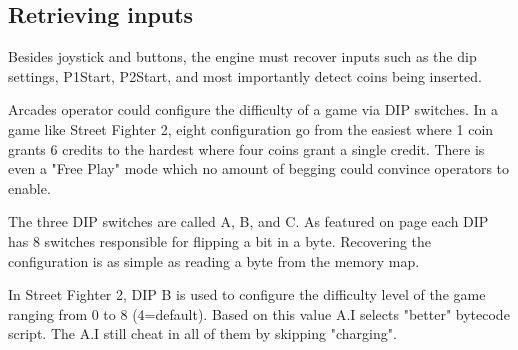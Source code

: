 \subsection{Retrieving inputs}
Besides joystick and buttons, the engine must recover inputs such as the dip settings, P1Start, P2Start, and most importantly detect coins being inserted.

\begin{trivia}
Arcades operator could configure the difficulty of a game via DIP switches. In a game like Street Fighter 2, eight configuration go from the easiest where 1 coin grants 6 credits to the hardest where four coins grant a single credit. There is even a "Free Play" mode which no amount of begging could convince operators to enable\cite{sf2manual}.
\end{trivia}

The three DIP switches are called A, B, and C. As featured on page \pageref{fig:boarda} each DIP has 8 switches responsible for flipping a bit in a byte. Recovering the configuration is as simple as reading a byte from the memory map.

\begin{trivia}
In Street Fighter 2, DIP B is used to configure the difficulty level of the game ranging from 0 to 8 (4=default). Based on this value A.I selects "better" bytecode\cite{sf2aiengine} script. The A.I still cheat in all of them by skipping "charging"\cite{sf2aiengine}.
\end{trivia}



